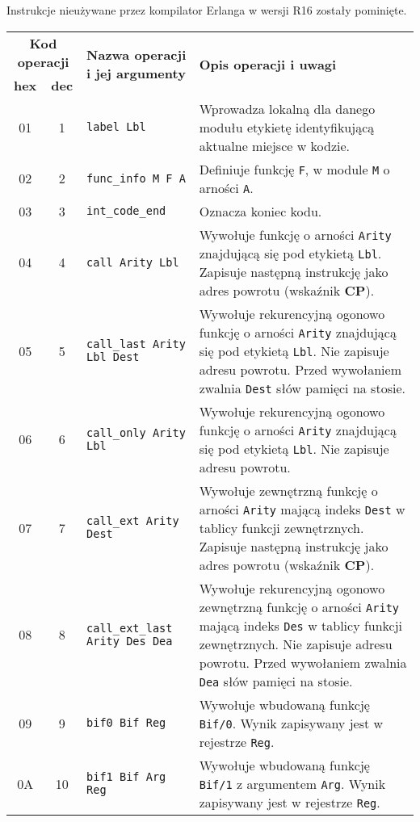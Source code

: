 Instrukcje nieużywane przez kompilator Erlanga w wersji R16 zostały pominięte.

\begin{longtable}{|c|c|p{5cm}|p{7cm}|}
\hline

\multicolumn{2}{|c|}{\textbf{Kod operacji}} & \multirow{2}{*}{\textbf{Nazwa operacji i jej argumenty}} & \multirow{2}{*}{\textbf{Opis operacji i uwagi}} \\
\cline{1-2}
\textbf{hex} & \textbf{dec} & & \\
\hline
\endfirsthead

01 & 1 & \texttt{label Lbl} & Wprowadza lokalną dla danego modułu etykietę identyfikującą aktualne miejsce w kodzie. \\
\hline
02 & 2 & \texttt{func\_info M F A} & Definiuje funkcję \texttt{F}, w module \texttt{M} o arności \texttt{A}. \\
\hline
03 & 3 & \texttt{int\_code\_end} & Oznacza koniec kodu.  \\
\hline
04 & 4 & \texttt{call Arity Lbl} & Wywołuje funkcję o arności \texttt{Arity} znajdującą się pod etykietą \texttt{Lbl}. Zapisuje następną instrukcję jako adres powrotu (wskaźnik \textbf{CP}). \\
\hline
05 & 5 & \texttt{call\_last Arity Lbl Dest} & Wywołuje rekurencyjną ogonowo funkcję o arności \texttt{Arity} znajdującą się pod etykietą \texttt{Lbl}. Nie zapisuje adresu powrotu. Przed wywołaniem zwalnia \texttt{Dest} słów pamięci na stosie.\\
\hline
06 & 6 & \texttt{call\_only Arity Lbl} & Wywołuje rekurencyjną ogonowo funkcję o arności \texttt{Arity} znajdującą się pod etykietą \texttt{Lbl}. Nie zapisuje adresu powrotu. \\
\hline
07 & 7 & \texttt{call\_ext Arity Dest} & Wywołuje zewnętrzną funkcję o arności \texttt{Arity} mającą indeks \texttt{Dest} w tablicy funkcji zewnętrznych. Zapisuje następną instrukcję jako adres powrotu (wskaźnik \textbf{CP}). \\
\hline
08 & 8 & \texttt{call\_ext\_last Arity Des Dea} & Wywołuje rekurencyjną ogonowo zewnętrzną funkcję o arności \texttt{Arity} mającą indeks \texttt{Des} w tablicy funkcji zewnętrznych. Nie zapisuje adresu powrotu. Przed wywołaniem zwalnia \texttt{Dea} słów pamięci na stosie.\\
\hline
09 & 9 & \texttt{bif0 Bif Reg} & Wywołuje wbudowaną funkcję \texttt{Bif/0}. Wynik zapisywany jest w rejestrze \texttt{Reg}. \\
\hline
0A & 10 & \texttt{bif1 Bif Arg Reg} & Wywołuje wbudowaną funkcję \texttt{Bif/1} z argumentem \texttt{Arg}. Wynik zapisywany jest w rejestrze \texttt{Reg}. \\

\end{longtable}
